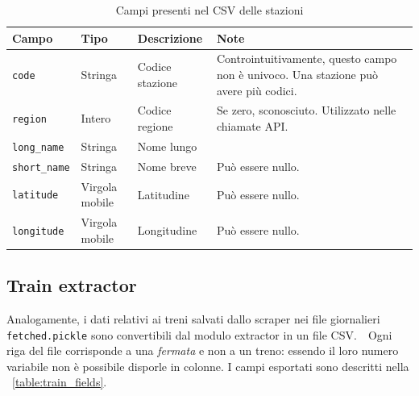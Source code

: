 \documentclass[12pt,italian]{report}
\begin{document}
\begin{table}[h]
    \small
    \begin{tabular}{m{2cm} || m{1.7cm} | m{3cm} | m{6cm}}
      \textbf{Campo} & \textbf{Tipo} & \textbf{Descrizione} & \textbf{Note} \\
      \hline \texttt{code} & Stringa & Codice stazione & Controintuitivamente,
                                                         questo campo non è
                                                         univoco. Una
                                                         stazione può avere
                                                         più codici. \\
      \hline \texttt{region} & Intero & Codice regione & Se zero,
                                                         sconosciuto.
                                                         Utilizzato nelle
                                                         chiamate API.\\
      \hline \texttt{long\_name} & Stringa & Nome lungo & \\
      \hline \texttt{short\_name} & Stringa & Nome breve & Può essere nullo.
      \\ \hline \texttt{latitude} & Virgola mobile & Latitudine & Può essere
                                                                  nullo. \\
      \hline \texttt{longitude} & Virgola mobile & Longitudine & Può essere
                                                                 nullo.
    \end{tabular}
    \caption{Campi presenti nel CSV delle stazioni}
    \label{table:station_fields}
\end{table}

\subsection{Train extractor}

Analogamente, i dati relativi ai treni salvati dallo scraper nei file
giornalieri \texttt{fetched\-.pickle} sono convertibili dal modulo
extractor in un file CSV.\ \ Ogni riga del file corrisponde a una
\textit{fermata} e non a un treno: essendo il loro numero variabile
non è possibile disporle in colonne.  I campi esportati sono descritti
nella \tablename\ \ref{table:train_fields}.
\end{document}

